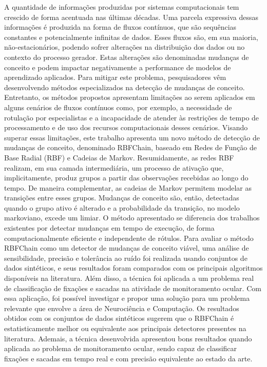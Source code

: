 \documentclass[msc, classic, a4paper]{ufbathesis}
\begin{document}
A quantidade de informações produzidas por sistemas computacionais tem crescido de forma acentuada nas últimas décadas.
Uma parcela expressiva dessas informações é produzida na forma de fluxos contínuos, que são sequências constantes e potencialmente infinitas de dados.
Esses fluxos são, em sua maioria, não-estacionários, podendo sofrer alterações na distribuição dos dados ou no contexto do processo gerador.
Estas alterações são denominadas mudanças de conceito e podem impactar negativamente a performance de modelos de aprendizado aplicados.
Para mitigar este problema, pesquisadores vêm desenvolvendo métodos especializados na detecção de mudanças de conceito.
Entretanto, os métodos propostos apresentam limitações ao serem aplicados em alguns cenários de fluxos contínuos como, por exemplo,
a necessidade de rotulação por especialistas e a incapacidade de atender às restrições de tempo de processamento e de uso dos recursos computacionais desses cenários.
Visando superar essas limitações, este trabalho apresenta um novo método de detecção de mudanças de conceito, denominado RBFChain, baseado em Redes de Função de Base Radial (RBF) e Cadeias de Markov.
Resumidamente, as redes RBF realizam, em sua camada intermediária, um processo de ativação que, implicitamente, produz grupos a partir das observações recebidas ao longo do tempo.
De maneira complementar, as cadeias de Markov permitem modelar as transições entre esses grupos.
Mudanças de conceito são, então, detectadas quando o grupo ativo é alterado e a probabilidade da transição, no modelo markoviano, excede um limiar.
O método apresentado se diferencia dos trabalhos existentes por detectar mudanças em tempo de execução, de forma computacionalmente eficiente e independente de rótulos.
Para avaliar o método RBFChain como um detector de mudanças de conceito viável, uma análise de sensibilidade, precisão e tolerância ao ruído foi realizada usando conjuntos de dados sintéticos,
e seus resultados foram comparados com os principais algoritmos disponíveis na literatura.
Além disso, a técnica foi aplicada a um problema real de classificação de fixações e sacadas na atividade de monitoramento ocular.
Com essa aplicação, foi possível investigar e propor uma solução para um problema relevante que envolve a área de Neurociência e Computação.
Os resultados obtidos com os conjuntos de dados sintéticos sugerem que o RBFChain é estatisticamente melhor ou equivalente aos principais detectores presentes na literatura.
Ademais, a técnica desenvolvida apresentou bons resultados quando aplicada ao problema de monitoramento ocular,
sendo capaz de classificar fixações e sacadas em tempo real e com precisão equivalente ao estado da arte.
\end{document}
